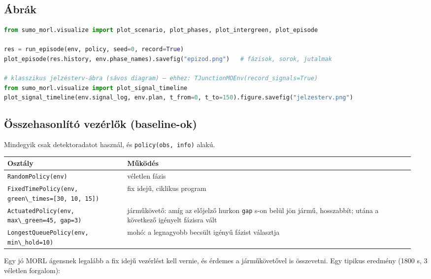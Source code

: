 \hypertarget{uxe1bruxe1k}{%
\subsection{Ábrák}\label{uxe1bruxe1k}}

\begin{lstlisting}[language=Python]
from sumo_morl.visualize import plot_scenario, plot_phases, plot_intergreen, plot_episode

res = run_episode(env, policy, seed=0, record=True)
plot_episode(res.history, env.phase_names).savefig("epizod.png")   # fázisok, sorok, jutalmak

# klasszikus jelzésterv-ábra (sávos diagram) – ehhez: TJunctionMOEnv(record_signals=True)
from sumo_morl.visualize import plot_signal_timeline
plot_signal_timeline(env.signal_log, env.plan, t_from=0, t_to=150).figure.savefig("jelzesterv.png")
\end{lstlisting}

\hypertarget{uxf6sszehasonluxedtuxf3-vezuxe9rlux151k-baseline-ok}{%
\subsection{Összehasonlító vezérlők
(baseline-ok)}\label{uxf6sszehasonluxedtuxf3-vezuxe9rlux151k-baseline-ok}}

Mindegyik csak detektoradatot használ,
és
\passthrough{\lstinline!policy(obs, info)!}
alakú.

\begin{longtable}[]{@{}>{\raggedright\arraybackslash}p{0.29\linewidth}>{\raggedright\arraybackslash}p{0.67\linewidth}@{}}
\toprule\noalign{}
Osztály & Működés \\
\midrule\noalign{}
\endhead
\bottomrule\noalign{}
\endlastfoot
\passthrough{\lstinline!RandomPolicy(env)!}
& véletlen fázis \\
\passthrough{\lstinline!FixedTimePolicy(env, green\_times=[30, 10, 15])!}
& fix idejű, ciklikus program \\
\passthrough{\lstinline!ActuatedPolicy(env, max\_green=45, gap=3)!}
& járműkövető: amíg az előjelző hurkon
\passthrough{\lstinline!gap!} s-on belül
jön jármű, hosszabbít; utána a következő
igényelt fázisra vált \\
\passthrough{\lstinline!LongestQueuePolicy(env, min\_hold=10)!}
& mohó: a legnagyobb becsült igényű
fázist választja \\
\end{longtable}

Egy jó MORL ágensnek legalább a fix
idejű vezérlést kell vernie, és érdemes
a járműkövetővel is összevetni. Egy
tipikus eredmény (1800 s, 3 véletlen
forgalom):

